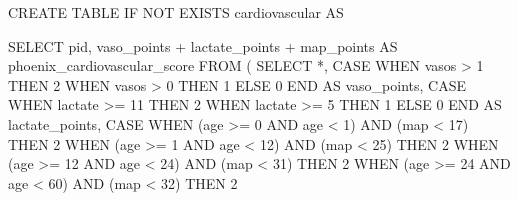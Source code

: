\documentclass[
  letterpaper,
  DIV=11,
  numbers=noendperiod]{scrartcl}
\newenvironment{Shaded}{\begin{snugshade}}{\end{snugshade}}
\newcommand{\ControlFlowTok}[1]{\textcolor[rgb]{0.00,0.23,0.31}{#1}}
\newcommand{\DecValTok}[1]{\textcolor[rgb]{0.68,0.00,0.00}{#1}}
\newcommand{\KeywordTok}[1]{\textcolor[rgb]{0.00,0.23,0.31}{#1}}
\newcommand{\NormalTok}[1]{\textcolor[rgb]{0.00,0.23,0.31}{#1}}
\newcommand{\OperatorTok}[1]{\textcolor[rgb]{0.37,0.37,0.37}{#1}}
\begin{document}
\begin{Shaded}
\begin{Highlighting}[]
\KeywordTok{CREATE} \KeywordTok{TABLE} \ControlFlowTok{IF} \KeywordTok{NOT} \KeywordTok{EXISTS}\NormalTok{ cardiovascular }\KeywordTok{AS}

\KeywordTok{SELECT}
\NormalTok{  pid,}
\NormalTok{  vaso\_points }\OperatorTok{+}\NormalTok{ lactate\_points }\OperatorTok{+}\NormalTok{ map\_points }\KeywordTok{AS}\NormalTok{ phoenix\_cardiovascular\_score}
\KeywordTok{FROM}
\NormalTok{(}
  \KeywordTok{SELECT} \OperatorTok{*}\NormalTok{,}
    \ControlFlowTok{CASE} \ControlFlowTok{WHEN}\NormalTok{ vasos }\OperatorTok{\textgreater{}} \DecValTok{1} \ControlFlowTok{THEN} \DecValTok{2}
         \ControlFlowTok{WHEN}\NormalTok{ vasos }\OperatorTok{\textgreater{}} \DecValTok{0} \ControlFlowTok{THEN} \DecValTok{1}
         \ControlFlowTok{ELSE} \DecValTok{0} \ControlFlowTok{END} \KeywordTok{AS}\NormalTok{ vaso\_points,}
    \ControlFlowTok{CASE} \ControlFlowTok{WHEN}\NormalTok{ lactate }\OperatorTok{\textgreater{}=} \DecValTok{11} \ControlFlowTok{THEN} \DecValTok{2}
         \ControlFlowTok{WHEN}\NormalTok{ lactate }\OperatorTok{\textgreater{}=}  \DecValTok{5} \ControlFlowTok{THEN} \DecValTok{1}
         \ControlFlowTok{ELSE} \DecValTok{0} \ControlFlowTok{END} \KeywordTok{AS}\NormalTok{ lactate\_points,}
    \ControlFlowTok{CASE} \ControlFlowTok{WHEN}\NormalTok{ (age }\OperatorTok{\textgreater{}=}   \DecValTok{0} \KeywordTok{AND}\NormalTok{ age }\OperatorTok{\textless{}}    \DecValTok{1}\NormalTok{) }\KeywordTok{AND}\NormalTok{ (map }\OperatorTok{\textless{}} \DecValTok{17}\NormalTok{) }\ControlFlowTok{THEN} \DecValTok{2}
         \ControlFlowTok{WHEN}\NormalTok{ (age }\OperatorTok{\textgreater{}=}   \DecValTok{1} \KeywordTok{AND}\NormalTok{ age }\OperatorTok{\textless{}}   \DecValTok{12}\NormalTok{) }\KeywordTok{AND}\NormalTok{ (map }\OperatorTok{\textless{}} \DecValTok{25}\NormalTok{) }\ControlFlowTok{THEN} \DecValTok{2}
         \ControlFlowTok{WHEN}\NormalTok{ (age }\OperatorTok{\textgreater{}=}  \DecValTok{12} \KeywordTok{AND}\NormalTok{ age }\OperatorTok{\textless{}}   \DecValTok{24}\NormalTok{) }\KeywordTok{AND}\NormalTok{ (map }\OperatorTok{\textless{}} \DecValTok{31}\NormalTok{) }\ControlFlowTok{THEN} \DecValTok{2}
         \ControlFlowTok{WHEN}\NormalTok{ (age }\OperatorTok{\textgreater{}=}  \DecValTok{24} \KeywordTok{AND}\NormalTok{ age }\OperatorTok{\textless{}}   \DecValTok{60}\NormalTok{) }\KeywordTok{AND}\NormalTok{ (map }\OperatorTok{\textless{}} \DecValTok{32}\NormalTok{) }\ControlFlowTok{THEN} \DecValTok{2}

\end{Highlighting}
\end{Shaded}
\end{document}
